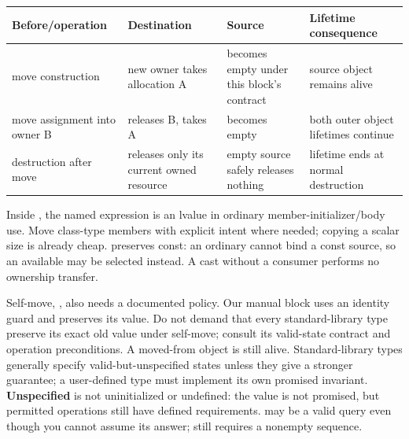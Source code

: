 {\def\LTcaptype{none} %
\begin{longtable}[]{@{}
  >{\raggedright\arraybackslash}p{}
  >{\raggedright\arraybackslash}p{}
  >{\raggedright\arraybackslash}p{}
  >{\raggedright\arraybackslash}p{}@{}}
\toprule\noalign{}
\begin{minipage}[b]{\linewidth}\raggedright
Before/operation
\end{minipage} & \begin{minipage}[b]{\linewidth}\raggedright
Destination
\end{minipage} & \begin{minipage}[b]{\linewidth}\raggedright
Source
\end{minipage} & \begin{minipage}[b]{\linewidth}\raggedright
Lifetime consequence
\end{minipage} \\
\midrule\noalign{}
\endhead
\bottomrule\noalign{}
\endlastfoot
move construction & new owner takes allocation A & becomes empty under this block's contract & source object remains alive \\
move assignment into owner B & releases B, takes A & becomes empty & both outer object lifetimes continue \\
destruction after move & releases only its current owned resource & empty source safely releases nothing & lifetime ends at normal destruction \\
\end{longtable}
}

Inside , the named expression  is an lvalue in ordinary member-initializer/body use. Move class-type members with explicit intent where needed; copying a scalar size is already cheap.  preserves const: an ordinary  cannot bind a const source, so an available  may be selected instead. A cast without a consumer performs no ownership transfer.

Self-move, , also needs a documented policy. Our manual block uses an identity guard and preserves its value. Do not demand that every standard-library type preserve its exact old value under self-move; consult its valid-state contract and operation preconditions. A moved-from object is still alive. Standard-library types generally specify valid-but-unspecified states unless they give a stronger guarantee; a user-defined type must implement its own promised invariant. \textbf{Unspecified} is not uninitialized or undefined: the value is not promised, but permitted operations still have defined requirements.  may be a valid query even though you cannot assume its answer;  still requires a nonempty sequence.

